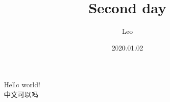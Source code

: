 \documentclass{article}        %
\title{Second day}
\author{Leo}
\date{2020.01.02}
\begin{document}
\maketitle
Hello world! \\
中文可以吗
\end{document}
